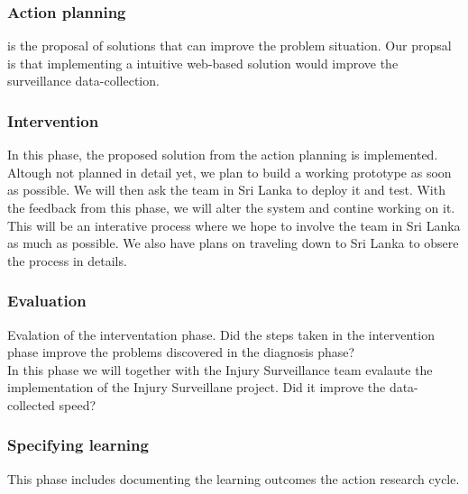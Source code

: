 \documentclass[UKenglish, 12pt]{article}
\begin{document}
\subsubsection*{Action planning} is the proposal of solutions that can improve the problem situation. Our propsal is that implementing a intuitive web-based solution would improve the surveillance data-collection.

\subsubsection*{Intervention} In this phase, the proposed solution from the action planning is implemented. Altough not planned in detail yet, we plan to build a working prototype as soon as possible. We will then ask the team in Sri Lanka to deploy it and test. With the feedback from this phase, we will alter the system and contine working on it. This will be an interative process where we hope to involve the team in Sri Lanka as much as possible. We also have plans on traveling down to Sri Lanka to obsere the process in details.

\subsubsection*{Evaluation} Evalation of the interventation phase. Did the steps taken in the intervention phase improve the problems discovered in the diagnosis phase? \\
In this phase we will together with the Injury Surveillance team evalaute the implementation of the Injury Surveillane project. Did it improve the data-collected speed?
\subsubsection*{Specifying learning} This phase includes documenting the learning outcomes the action research cycle. 

\pagebreak
\printbibliography
\end{document}
